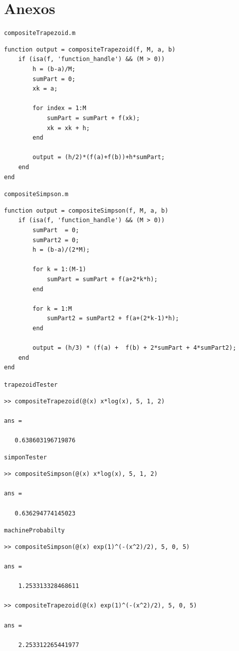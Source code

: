 \documentclass[english,notitlepage,letterpaper, 10pt]{article} %
\begin{document}
\section{Anexos}

    \texttt{compositeTrapezoid.m}

    \begin{lstlisting}
function output = compositeTrapezoid(f, M, a, b)
    if (isa(f, 'function_handle') && (M > 0))
        h = (b-a)/M;
        sumPart = 0;
        xk = a;

        for index = 1:M
            sumPart = sumPart + f(xk);
            xk = xk + h;
        end

        output = (h/2)*(f(a)+f(b))+h*sumPart;
    end
end
    \end{lstlisting}

    \texttt{compositeSimpson.m}

    \begin{lstlisting}
function output = compositeSimpson(f, M, a, b)
    if (isa(f, 'function_handle') && (M > 0))
        sumPart  = 0;
        sumPart2 = 0;
        h = (b-a)/(2*M);

        for k = 1:(M-1)
            sumPart = sumPart + f(a+2*k*h);
        end

        for k = 1:M
            sumPart2 = sumPart2 + f(a+(2*k-1)*h);
        end

        output = (h/3) * (f(a) +  f(b) + 2*sumPart + 4*sumPart2);
    end
end
   \end{lstlisting}

   \texttt{trapezoidTester}

   \begin{lstlisting}
>> compositeTrapezoid(@(x) x*log(x), 5, 1, 2)

ans =

   0.638603196719876
   \end{lstlisting}

   \texttt{simponTester}

   \begin{lstlisting}
>> compositeSimpson(@(x) x*log(x), 5, 1, 2)

ans =

   0.636294774145023
   \end{lstlisting}

   \texttt{machineProbabilty}
  
  \begin{lstlisting}
>> compositeSimpson(@(x) exp(1)^(-(x^2)/2), 5, 0, 5)

ans =

    1.253313328468611

>> compositeTrapezoid(@(x) exp(1)^(-(x^2)/2), 5, 0, 5)

ans =

    2.253312265441977
    \end{lstlisting}
\end{document}
